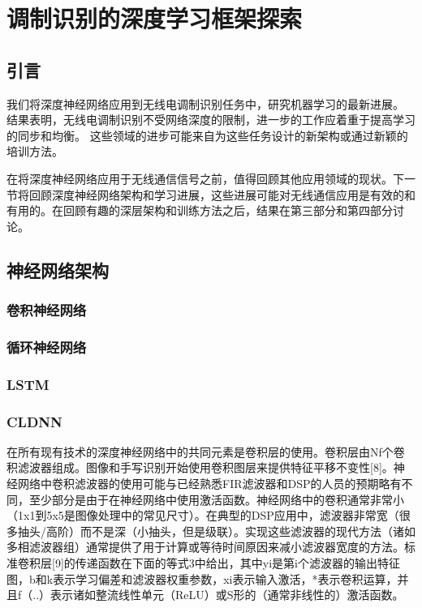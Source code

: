 \chapter{调制识别的深度学习框架探索}
\section{引言}
我们将深度神经网络应用到无线电调制识别任务中，研究机器学习的最新进展。 结果表明，无线电调制识别不受网络深度的限制，进一步的工作应着重于提高学习的同步和均衡。 这些领域的进步可能来自为这些任务设计的新架构或通过新颖的培训方法。\par

在将深度神经网络应用于无线通信信号之前，值得回顾其他应用领域的现状。下一节将回顾深度神经网络架构和学习进展，这些进展可能对无线通信应用是有效的和有用的。在回顾有趣的深层架构和训练方法之后，结果在第三部分和第四部分讨论。 \par

\section{神经网络架构}
\subsection{卷积神经网络}
\subsection{循环神经网络}
\subsection{LSTM}
\subsection{CLDNN}
在所有现有技术的深度神经网络中的共同元素是卷积层的使用。卷积层由Nf个卷积滤波器组成。图像和手写识别开始使用卷积图层来提供特征平移不变性[8]。神经网络中卷积滤波器的使用可能与已经熟悉FIR滤波器和DSP的人员的预期略有不同，至少部分是由于在神经网络中使用激活函数。神经网络中的卷积通常非常小（1x1到5x5是图像处理中的常见尺寸）。在典型的DSP应用中，滤波器非常宽（很多抽头/高阶）而不是深（小抽头，但是级联）。实现这些滤波器的现代方法（诸如多相滤波器组）通常提供了用于计算或等待时间原因来减小滤波器宽度的方法。标准卷积层[9]的传递函数在下面的等式3中给出，其中yi是第i个滤波器的输出特征图，b和k表示学习偏差和滤波器权重参数，xi表示输入激活，*表示卷积运算，并且f（..）表示诸如整流线性单元（ReLU）或S形的（通常非线性的）激活函数。\par

